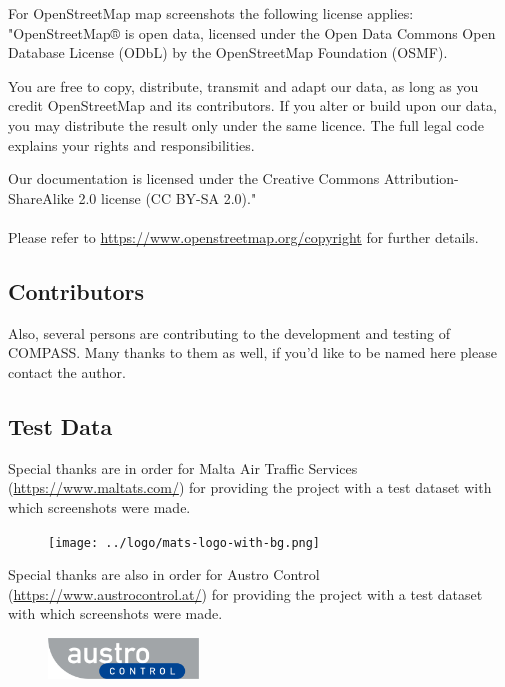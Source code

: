 For OpenStreetMap map screenshots the following license applies: \\
"OpenStreetMap® is open data, licensed under the Open Data Commons Open Database License (ODbL) by the OpenStreetMap Foundation (OSMF).

You are free to copy, distribute, transmit and adapt our data, as long as you credit OpenStreetMap and its contributors. If you alter or build upon our data, you may distribute the result only under the same licence. The full legal code explains your rights and responsibilities.

Our documentation is licensed under the Creative Commons Attribution-ShareAlike 2.0 license (CC BY-SA 2.0)." \\\\

Please refer to \href{https://www.openstreetmap.org/copyright}{https://www.openstreetmap.org/copyright} for further details.


\subsection{Contributors}

Also, several persons are contributing to the development and testing of COMPASS. Many thanks to them as well, if you'd like to be named here please contact the author.

\subsection{Test Data}

Special thanks are in order for Malta Air Traffic Services (\url{https://www.maltats.com/}) for providing the project with a test dataset with which screenshots were made. \\

\begin{figure}[H]
  \center
    \texttt{[image: ../logo/mats-logo-with-bg.png]}
\end{figure}

Special thanks are also in order for Austro Control (\url{https://www.austrocontrol.at/}) for providing the project with a test dataset with which screenshots were made. \\

\begin{figure}[H]
  \center
    \includegraphics[width=4cm]{../logo/Logo_Austro_Control.png}
\end{figure}



